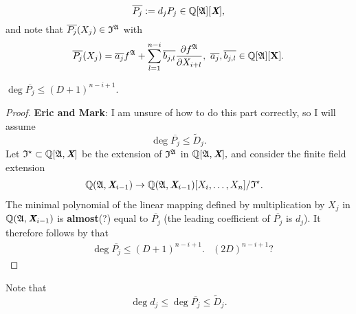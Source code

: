 \documentclass[sigconf]{acmart}
\def\Xb{\textit{\textbf{X}}}
\def\ajb{\overline{a_j}}
\def\bjb{\overline{b_{j,l}}}
\def\pjb{\overline{P_{j}}}
\def\Q{\mathbb{Q}}
\def\Dt{\widetilde{D}}
\def\I{\frak{I}}
\def\Is{\frak{I}^{\star}}
\def\A{\frak{A}}
\begin{document}
\[
\overline{P_{j}} := d_jP_{j}\in \Q[\A][\Xb],
\]
and note that $\pjb(X_j) \in \I^{\A}$ with 
\[
\pjb(X_j) = \ajb f^{\A} + \sum_{l=1}^{n-i}\bjb \frac{\partial f^\A}{\partial X_{i+l}}, ~\ajb,\bjb \in \mathbb{Q}[\A][\textbf{X}].
\]
%
\begin{proposition} 
$\deg \pjb\leq (D+1)^{n-i+1}.$ 
\end{proposition} 
%
\begin{proof}
\textbf{Eric and Mark}: I am unsure of how to do this part correctly, so I will assume 
\[
\deg \pjb\leq \Dt_j.
\]
Let $\Is \subset \Q[\A,\Xb]$ be the extension of $\I^{\A}$ in  $\Q[\A,\Xb],$ and consider the finite field extension
%
\begin{align*}
    \Q(\A,\Xb_{i-1}) &\rightarrow \Q(\A,\Xb_{i-1})[X_i,\hdots,X_n]/\Is.
\end{align*}
%
The minimal polynomial of the linear mapping defined by multiplication by $X_j$ in $\Q(\A,\Xb_{i-1})$ is \textbf{almost}(?) equal to $\pjb$ (the leading coefficient of $\pjb$ is $d_j$). It therefore follows by \cite[Proposition 1]{CGR} that
%
\begin{align*}
&\deg \pjb \leq (D+1)^{n-i+1}.&(2D)^{n-i+1}\textrm{?} 
\end{align*}
%
\end{proof}
%
Note that 
\[
\deg d_j \leq \deg \pjb \leq \Dt_j.
\]
%
\end{document}

